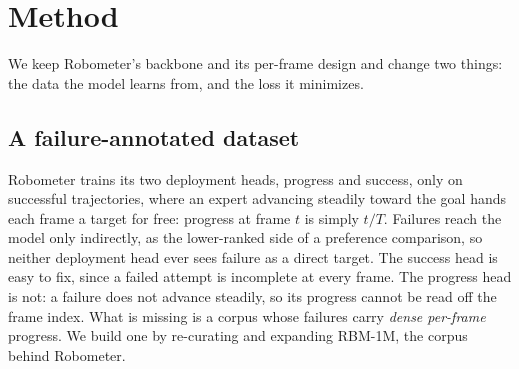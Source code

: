 \section{Method}
\label{sec:method}

We keep Robometer's backbone and its per-frame design and change two things: the
data the model learns from, and the loss it minimizes.

\subsection{A failure-annotated dataset}
\label{sec:method-data}

Robometer trains its two deployment heads, progress and success, only on
successful trajectories, where an expert advancing steadily toward the goal hands
each frame a target for free: progress at frame $t$ is simply $t/T$. Failures
reach the model only indirectly, as the lower-ranked side of a preference
comparison, so neither deployment head ever sees failure as a direct target. The
success head is easy to fix, since a failed attempt is incomplete at every frame.
The progress head is not: a failure does not advance steadily, so its progress
cannot be read off the frame index. What is missing is a corpus whose failures
carry \emph{dense per-frame} progress. We build one by re-curating and expanding
RBM-1M, the corpus behind Robometer.

